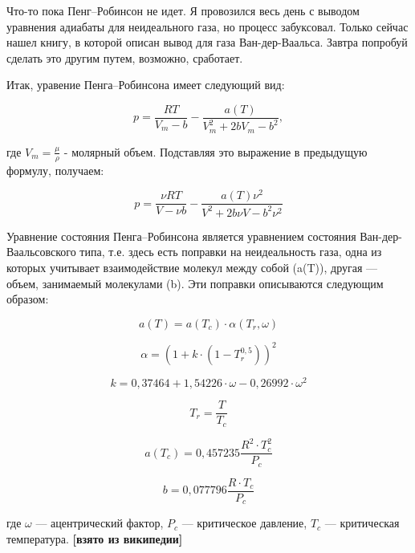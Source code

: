 \documentclass[a4paper,14pt]{article}
\theoremstyle{plain} %
\theoremstyle{definition} %
\theoremstyle{remark} %
\begin{document}
Что-то пока Пенг--Робинсон не идет. Я провозился весь день с выводом уравнения адиабаты для неидеального газа, но процесс забуксовал. Только сейчас нашел книгу, в которой описан вывод для газа Ван-дер-Ваальса. Завтра попробуй сделать это другим путем, возможно, сработает.

Итак, уравение Пенга--Робинсона имеет следующий вид:

\begin{equation}
	p = \frac{R T}{V_m - b} - \frac{a(T)}{V_m^2 + 2 b V_m - b^2}, 
\end{equation}

где $V_m = \frac{\mu}{\rho}$ - молярный объем. Подставляя это выражение в предыдущую формулу, получаем:

\begin{equation}
	p = \frac{\nu R T}{V - \nu b} - \frac{a(T) \nu^2}{V^2 + 2 b \nu V - b^2 \nu^2}
\end{equation}

Уравнение состояния Пенга--Робинсона является уравнением состояния Ван-дер-Ваальсовского типа, т.е. здесь есть поправки на неидеальность газа, одна из которых учитывает взаимодействие молекул между собой (a(T)), другая --- объем, занимаемый молекулами (b). Эти поправки описываются следующим образом:

\begin{equation}
	a(T) = a (T_c) \cdot \alpha(T_r, \omega)
\end{equation}

\begin{equation}
	\alpha = (1 + k \cdot (1 - T_r^{0,5}))^2
\end{equation}

\begin{equation}
	k = 0,37464 + 1,54226 \cdot \omega - 0,26992 \cdot \omega^2
\end{equation}

\begin{equation}
	T_r = \frac{T}{T_c}
\end{equation}

\begin{equation}
	a(T_c) = 0,457235 \frac{R^2 \cdot T_c^2}{P_c}
\end{equation}

\begin{equation}
	b = 0,077796 \frac{R \cdot T_c}{P_c}
\end{equation}

где $\omega$ --- ацентрический фактор, $P_c$ --- критическое давление, $T_c$ --- критическая температура. \textbf{[взято из википедии]}
\end{document}
